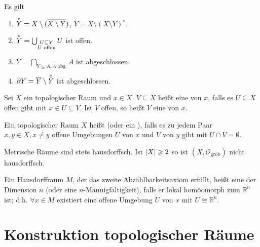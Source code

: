 \begin{bemerkung}[{name=[{Eigenschaften von Innerem, Abschluss und Rand}]}]
	Es gilt
	\begin{enumerate}[1)]
		\item $\interior Y = X \setminus (\overline{X \setminus Y} )$, $\overline{Y} = X \setminus (X \setminus Y)^\circ$.
		\item $\interior Y = \bigcup_{\substack{U \subseteq Y \\ U \text{ offen}}} U$ ist offen.
		\item $\overline{Y} = \bigcap_{Y \subseteq A, A \text{ abg.}} A$ ist abgeschlossen.
		\item $\partial Y = \overline{Y} \setminus \interior Y $ ist abgeschlossen.
	\end{enumerate}
\end{bemerkung}

\begin{definition}[{name=[Umgebung]}]
	Sei $X$ ein topologischer Raum und $x \in X$.
	$V \subseteq X$ heißt eine  von $x$, falls es $U \subseteq X$ offen gibt mit $x \in U \subseteq V$.
	Ist $V$ offen, so heißt $V$ eine  von $x$.
\end{definition}
%
\begin{definition}[{name=[Hausdorffraum]}]
	Ein topologischer Raum $X$ heißt  (oder ein ), falls es zu jedem Paar $x,y \in X, x \neq y$ offene Umgebungen $U$ von $x$ und $V$ von $y$ gibt mit $U \cap V = \emptyset$.
\end{definition}

Metrische Räume sind stets hausdorffsch.
Ist $\abs*{X} \ge 2 $ so ist $(X, \mathcal{O}_{\text{grob}})$ nicht hausdorffsch.

\begin{definition}[{name=[topologische Mannigfaltigkeit]}]
	Ein Hausdorffraum $M$, der das zweite Abzählbarkeitsaxiom erfüllt, heißt eine  der Dimension $n$ (oder eine $n$-Mannigfaltigkeit), falls er lokal homöomorph zum $\mathbb{R}^n$ ist; d.h. $\forall x \in M$ existiert eine offene Umgebung $U$ von $x$ mit $U \cong \mathbb{R}^n$.
\end{definition}

\newpage

\section{Konstruktion topologischer Räume} %
\label{sec:konst_topo}

